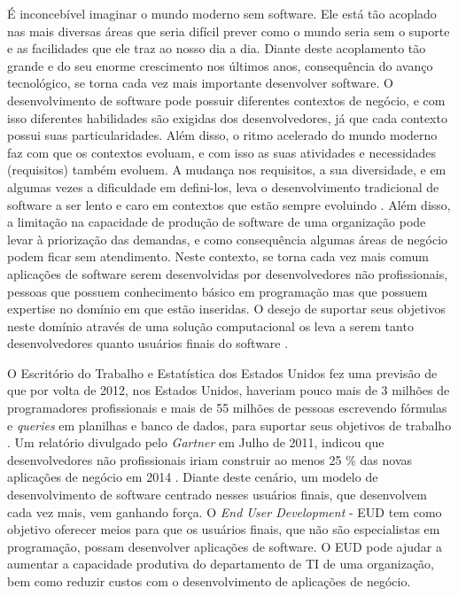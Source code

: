 É inconcebível imaginar o mundo moderno sem software. Ele está tão acoplado nas mais diversas áreas que seria difícil prever como o mundo seria sem o suporte e as facilidades que ele traz ao nosso dia a dia. Diante deste acoplamento tão grande e do seu enorme crescimento nos últimos anos, consequência do avanço tecnológico, se torna cada vez mais importante desenvolver software. O desenvolvimento de software pode possuir diferentes contextos de negócio, e com isso diferentes habilidades são exigidas dos desenvolvedores, já que cada contexto possui suas particularidades. Além disso, o ritmo acelerado do mundo moderno faz com que os contextos evoluam, e com isso as suas atividades e necessidades (requisitos) também evoluem. A mudança nos requisitos, a sua diversidade, e em algumas vezes a dificuldade em defini-los, leva o desenvolvimento tradicional de software a ser lento e caro em contextos que estão sempre evoluindo \cite{lieberman2006}. Além disso, a limitação na capacidade de produção de software de uma organização pode levar à priorização das demandas, e como consequência algumas áreas de negócio podem ficar sem atendimento. Neste contexto, se torna cada vez mais comum aplicações de software serem desenvolvidas por desenvolvedores não profissionais, pessoas que possuem conhecimento básico em programação mas que possuem expertise no domínio em que estão inseridas. O desejo de suportar seus objetivos neste domínio através de uma solução computacional os leva a serem tanto desenvolvedores quanto usuários finais do software \cite{lieberman2006}. 

O Escritório do Trabalho e Estatística dos Estados Unidos fez uma previsão de que por volta de 2012, nos Estados Unidos, haveriam pouco mais de 3 milhões de programadores profissionais e mais de 55 milhões de pessoas escrevendo fórmulas e \textit{queries} em planilhas e banco de dados, para suportar seus objetivos de trabalho \cite{scaffidi2005}. Um relatório divulgado pelo \textit{Gartner} em Julho de 2011, indicou que desenvolvedores não profissionais iriam construir ao menos 25 \% das novas aplicações de negócio em 2014 \cite{paterno2013}. Diante deste cenário, um modelo de desenvolvimento de software centrado nesses usuários finais, que desenvolvem cada vez mais, vem ganhando força. O \textit{End User Development} - EUD tem como objetivo oferecer meios para que os usuários finais, que não são especialistas em programação, possam desenvolver aplicações de software. O EUD pode ajudar a aumentar a capacidade produtiva do departamento de TI de uma organização, bem como reduzir custos com o desenvolvimento de aplicações de negócio.

